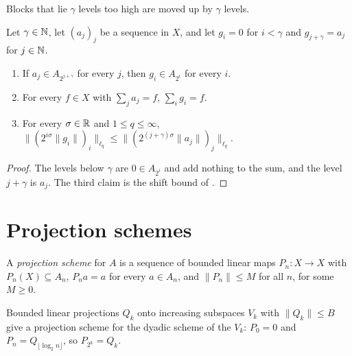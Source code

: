 Blocks that lie $\gamma$ levels too high are moved up by $\gamma$ levels.

\begin{lemma}
\label{lem:shifted-blocks}
\leanok
{}
Let $\gamma \in \mathbb{N}$, let $(a_j)_j$ be a sequence in $X$, and let $g_i = 0$ for $i < \gamma$ and
$g_{j+\gamma} = a_j$ for $j \in \mathbb{N}$.
\begin{enumerate}
\item If $a_j \in A_{2^{j+\gamma}}$ for every $j$, then $g_i \in A_{2^i}$ for every $i$.
\item For every $f \in X$ with $\sum_j a_j = f$, $\sum_i g_i = f$.
\item For every $\sigma \in \mathbb{R}$ and $1 \leq q \leq \infty$,
  $\|(2^{i\sigma} \|g_i\|)_i\|_{\ell_q} \leq \|(2^{(j+\gamma)\sigma} \|a_j\|)_j\|_{\ell_q}$.
\end{enumerate}
\end{lemma}

\begin{proof}
\leanok
{}
The levels below $\gamma$ are $0 \in A_{2^i}$ and add nothing to the sum, and the level
$j + \gamma$ is $a_j$. The third claim is the shift bound of .
\end{proof}

\section{Projection schemes}

\begin{definition}
\label{def:projection-scheme}
\leanok
{}
A \emph{projection scheme} for $A$ is a sequence of bounded linear maps $P_n : X \to X$ with
$P_n(X) \subseteq A_n$, $P_n a = a$ for every $a \in A_n$, and $\|P_n\| \leq M$ for all $n$,
for some $M \geq 0$.
\end{definition}

Bounded linear projections $Q_k$ onto increasing subspaces $V_k$ with $\|Q_k\| \leq B$ give a
projection scheme for the dyadic scheme of the $V_k$: $P_0 = 0$ and
$P_n = Q_{\lfloor \log_2 n \rfloor}$, so $P_{2^k} = Q_k$.

